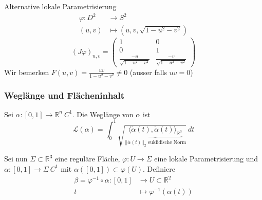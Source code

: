 \documentclass[../main.tex]{subfiles}
\begin{document}
\begin{examples}
\begin{enumerate}
        Alternative lokale Parametrisierung
        \begin{align*}
            \varphi : D^2 &\to S^2 \\
            (u,v) &\mapsto (u,v,\sqrt{1-u^2-v^2})
        \end{align*}
        $$(J\varphi)_{u,v}= \begin{pmatrix}
            1 & 0 \\
            0 & 1 \\
            \frac{-u}{\sqrt{1-u^2-v^2}} & \frac{-v}{\sqrt{1-u^2-v^2}}
        \end{pmatrix}$$
        Wir bemerken $F(u,v)= \frac{uv}{1-u^2-v^2} \not = 0$ (ausser falls $uv=0$)
    \end{enumerate}
\end{examples}

\subsubsection*{Weglänge und Flächeninhalt}
\begin{recall}
    Sei $\alpha: [0,1] \to \mathbb{R}^n \ C^1$.
    Die Weglänge von $\alpha$ ist
    $$\mathcal{L} (\alpha) = \int _0 ^1 \sqrt{\underbrace{\langle\dot{\alpha}(t), \dot{\alpha}(t)\rangle _{\mathbb{R}^3}}_{||\dot{\alpha}(t)||_2 \text{ euklidische Norm}}} \ dt$$
\end{recall}

Sei nun $\Sigma \subset \mathbb{R}^3$ eine reguläre Fläche,
$\varphi : U \to \Sigma$ eine lokale Parametrisierung und $\alpha : [0,1] \to \Sigma \ C^1$ mit $\alpha([0,1])\subset \varphi(U)$.
Definiere 
\begin{align*}
    \beta = \varphi ^{-1} \circ \alpha : [0,1] &\to U \subset \mathbb{R}^2 \\
    t &\mapsto \varphi^{-1}(\alpha(t))
\end{align*}
\end{document}
